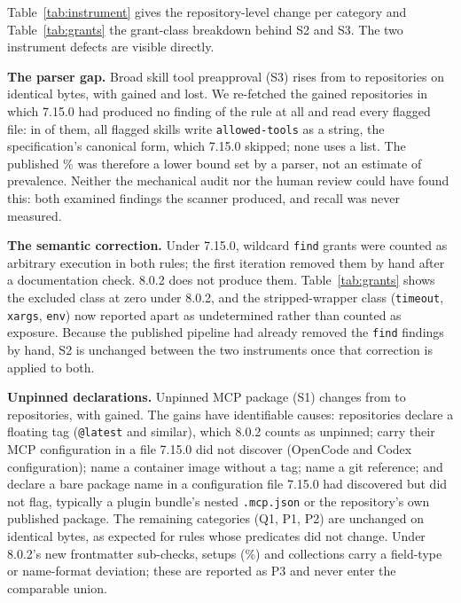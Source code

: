 \documentclass[10pt,conference]{IEEEtran}
\newcommand{\vold}{7.15.0}
\newcommand{\vnew}{8.0.2}
\newcommand{\pct}[1]{#1\%}
\begin{document}
\begin{table}[t]
\centering
\caption{Grant classes by repository, settings (S2) and skills (S3), \vold{} and \vnew{} on identical bytes. Only the first two classes enter the headline.}
\label{tab:grants}
\footnotesize

\end{table}

Table~\ref{tab:instrument} gives the repository-level change per category and Table~\ref{tab:grants} the grant-class breakdown behind S2 and S3. The two instrument defects are visible directly.

\textbf{The parser gap.} Broad skill tool preapproval (S3) rises from \InstSThreeOld{} to \InstSThreeNew{} repositories on identical bytes, with \InstSThreeGained{} gained and \InstSThreeLost{} lost. We re-fetched the \InstSThreeGainChecked{} gained repositories in which \vold{} had produced no finding of the rule at all and read every flagged file: in \InstSThreeGainString{} of them, all \InstSThreeGainFiles{} flagged skills write \texttt{allowed-tools} as a string, the specification's canonical form, which \vold{} skipped; none uses a list. The published \pct{\SThreeOldSetupsPct} was therefore a lower bound set by a parser, not an estimate of prevalence. Neither the mechanical audit nor the human review could have found this: both examined findings the scanner produced, and recall was never measured.

\textbf{The semantic correction.} Under \vold{}, wildcard \texttt{find} grants were counted as arbitrary execution in both rules; the first iteration removed them by hand after a documentation check. \vnew{} does not produce them. Table~\ref{tab:grants} shows the excluded class at zero under \vnew{}, and the stripped-wrapper class (\texttt{timeout}, \texttt{xargs}, \texttt{env}) now reported apart as undetermined rather than counted as exposure. Because the published pipeline had already removed the \texttt{find} findings by hand, S2 is unchanged between the two instruments once that correction is applied to both.

\textbf{Unpinned declarations.} Unpinned MCP package (S1) changes from \InstSOneOld{} to \InstSOneNew{} repositories, with \InstSOneGained{} gained. The gains have identifiable causes: \InstSOneGainTag{} repositories declare a floating tag (\texttt{@latest} and similar), which \vnew{} counts as unpinned; \InstSOneGainDiscovery{} carry their MCP configuration in a file \vold{} did not discover (OpenCode and Codex configuration); \InstSOneGainContainer{} name a container image without a tag; \InstSOneGainGit{} name a git reference; and \InstSOneGainOther{} declare a bare package name in a configuration file \vold{} had discovered but did not flag, typically a plugin bundle's nested \texttt{.mcp.json} or the repository's own published package. The remaining categories (Q1, P1, P2) are unchanged on identical bytes, as expected for rules whose predicates did not change. Under \vnew{}'s new frontmatter sub-checks, \PThreeSetups{} setups (\pct{\PThreeSetupsPct}) and \PThreeCols{} collections carry a field-type or name-format deviation; these are reported as P3 and never enter the comparable union.
\end{document}
